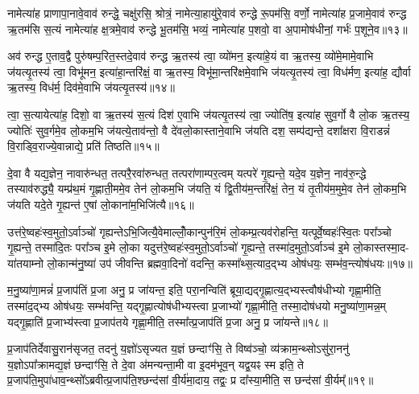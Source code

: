 नामेत्या॑ह प्राणापा॒नावे॒वाव॑ रुन्द्धे॒ चक्षु॑रसि॒ श्रोत्रं॒ नामेत्या॒हायु॑रे॒वाव॑ रुन्द्धे रू॒पम॑सि॒ वर्णो॒ नामेत्या॑ह प्र॒जामे॒वाव॑ रुन्द्ध ऋ॒तम॑सि स॒त्यं नामेत्या॑ह क्ष॒त्रमे॒वाव॑ रुन्द्धे भू॒तम॑सि॒ भव्यं॒ नामेत्या॑ह प॒शवो॒ वा अ॒पामोष॑धीनां॒ गर्भः॑ प॒शूने॒व॥१३॥

अव॑ रुन्द्ध ए॒ताव॒द्वै पुरु॑षम्प॒रित॒स्तदे॒वाव॑ रुन्द्ध ऋ॒तस्य॑ त्वा॒ व्यो॑मन॒ इत्या॑हे॒यं वा ऋ॒तस्य॒ व्यो॑मे॒मामे॒वाभि ज॑यत्यृ॒तस्य॑ त्वा॒ विभू॑मन॒ इत्या॑हा॒न्तरि॑क्षं॒ वा ऋ॒तस्य॒ विभू॑मा॒न्तरि॑क्षमे॒वाभि ज॑यत्यृ॒तस्य॑ त्वा॒ विध॑र्मण॒ इत्या॑ह॒ द्यौर्वा ऋ॒तस्य॒ विध॑र्म॒ दिव॑मे॒वाभि ज॑यत्यृ॒तस्य॑॥१४॥

त्वा॒ स॒त्यायेत्या॑ह॒ दिशो॒ वा ऋ॒तस्य॑ स॒त्यं दिश॑ ए॒वाभि ज॑यत्यृ॒तस्य॑ त्वा॒ ज्योति॑ष॒ इत्या॑ह सुव॒र्गो वै लो॒क ऋ॒तस्य॒ ज्योतिः॑ सुव॒र्गमे॒व लो॒कम॒भि ज॑यत्ये॒ताव॑न्तो॒ वै दे॑वलो॒कास्ताने॒वाभि ज॑यति दश॒ सम्प॑द्यन्ते॒ दशा᳚क्षरा वि॒राडन्नं॑ वि॒राड्वि॒राज्ये॒वान्नाद्ये॒ प्रति॑ तिष्ठति॥१५॥

{\anuvakamend[{व्यो॑मन ऋ॒तस्य॑ प्रा॒णः प॒शूने॒व विध॑र्म॒ दिव॑मे॒वाभि ज॑यत्यृ॒तस्य॒ षट्च॑त्वारिꣳशच्च॥५॥}]}

दे॒वा वै यद्य॒ज्ञेन॒ नावारु॑न्धत॒ तत्परै॒रवा॑रुन्धत॒ तत्परा॑णाम्पर॒त्वम् यत्परे॑ गृ॒ह्यन्ते॒ यदे॒व य॒ज्ञेन॒ नाव॑रु॒न्द्धे तस्याव॑रुद्ध्यै॒ यम्प्र॑थ॒मं गृ॒ह्णाती॒ममे॒व तेन॑ लो॒कम॒भि ज॑यति॒ यं द्वि॒तीय॑म॒न्तरि॑क्षं॒ तेन॒ यं तृ॒तीय॑म॒मुमे॒व तेन॑ लो॒कम॒भि ज॑यति यदे॒ते गृ॒ह्यन्त॑ ए॒षां लो॒काना॑म॒भिजि॑त्यै॥१६॥

उत्त॑रे॒ष्वहः॑स्व॒मुतो॒\-ऽर्वाञ्चो॑ गृह्यन्ते\-ऽभि॒जित्यै॒वेमाल्लोँ॒कान्पुन॑रि॒मं लो॒कम्प्र॒त्यव॑रोहन्ति॒ यत्पूर्वे॒ष्वहः॑स्वि॒तः परा᳚ञ्चो गृ॒ह्यन्ते॒ तस्मा॑दि॒तः परा᳚ञ्च इ॒मे लो॒का यदुत्त॑रे॒ष्वहः॑स्व॒मुतो॒\-ऽर्वाञ्चो॑ गृ॒ह्यन्ते॒ तस्मा॑द॒मुतो॒\-ऽर्वाञ्च॑ इ॒मे लो॒कास्तस्मा॒द- या॑तयाम्नो लो॒कान्म॑नु॒ष्या॑ उप॑ जीवन्ति ब्रह्मवा॒दिनो॑ वदन्ति॒ कस्मा᳚थ्स॒त्याद॒द्भ्य ओष॑धयः॒ सम्भ॑व॒न्त्योष॑धयः॥१७॥

म॒नु॒ष्या॑णा॒मन्नं॑ प्र॒जाप॑तिं प्र॒जा अनु॒ प्र जा॑यन्त॒ इति॒ परा॒नन्विति॑ ब्रूया॒द्यद्गृ॒ह्णात्य॒द्भ्यस्त्वौष॑धीभ्यो गृह्णा॒मीति॒ तस्मा॑द॒द्भ्य ओष॑धयः॒ सम्भ॑वन्ति॒ यद्गृ॒ह्णात्योष॑धीभ्यस्त्वा प्र॒जाभ्यो॑ गृह्णा॒मीति॒ तस्मा॒दोष॑धयो मनु॒ष्या॑णा॒मन्न॒म् यद्गृ॒ह्णाति॑ प्र॒जाभ्य॑स्त्वा प्र॒जाप॑तये गृह्णा॒मीति॒ तस्मा᳚त्प्र॒जाप॑तिं प्र॒जा अनु॒ प्र जा॑यन्ते॥१८॥

{\anuvakamend[{अ॒भिजि॑त्या॒ ओष॑धयो॒\-ऽष्टाच॑त्वारिꣳशच्च॥६॥}]}

प्र॒जाप॑तिर्देवासु॒रान॑सृजत॒ तदनु॑ य॒ज्ञो॑\-ऽसृज्यत य॒ज्ञं छन्दाꣳ॑सि॒ ते विष्व॑ञ्चो॒ व्य॑क्राम॒न्थ्सो\-ऽसु॑रा॒ननु॑ य॒ज्ञो\-ऽपा᳚क्रामद्य॒ज्ञं छन्दाꣳ॑सि॒ ते दे॒वा अ॑मन्यन्ता॒मी वा इ॒दम॑भूव॒न् यद्व॒यꣴ स्म इति॒ ते प्र॒जाप॑ति॒मुपा॑धाव॒न्थ्सो᳚\-ऽब्रवीत्प्र॒जाप॑ति॒श्छन्द॑सां वी॒र्य॑मा॒दाय॒ तद्वः॒ प्र दा᳚स्या॒मीति॒ स छन्द॑सां वी॒र्यम्᳚॥१९॥

